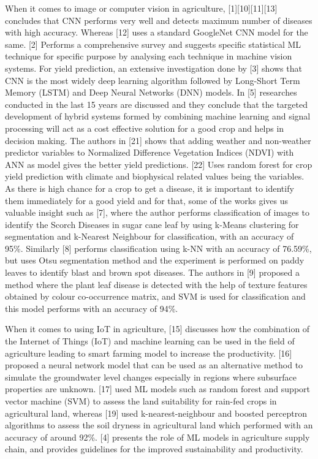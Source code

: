 \documentclass[12pt]{article}
\begin{document}
When it comes to image or computer vision in agriculture, [1][10][11][13] concludes that CNN performs very well  and detects maximum number of diseases with high accuracy. Whereas [12] uses a standard GoogleNet CNN model for the same. [2] Performs a comprehensive survey and suggests specific statistical ML technique for specific purpose by analysing each technique in machine vision systems. For yield prediction, an extensive investigation done by [3] shows that CNN is the most widely deep learning algorithm followed by Long-Short Term Memory (LSTM) and Deep Neural Networks (DNN) models. In [5] researches conducted in the last 15 years are discussed and they conclude that the targeted development of hybrid systems formed by combining machine learning and signal processing will act as a cost effective solution for a good crop and helps in decision making. The authors in [21] shows that adding weather and non-weather predictor variables to Normalized Difference Vegetation Indices (NDVI) with ANN as model gives the better yield predictions. [22] Uses random forest for crop yield prediction with climate and biophysical related values being the variables. As there is high chance for a crop to get a disease, it is important to identify them immediately for a good yield and for that, some of the works gives us valuable insight such as [7], where the author performs classification of images to identify the Scorch Diseases in sugar cane leaf by using k-Means clustering for segmentation and k-Nearest Neighbour for classification, with an accuracy of 95\%. Similarly [8] performs classification using k-NN with an accuracy of 76.59\%, but uses Otsu segmentation method and the experiment is performed on paddy leaves to identify blast and brown spot diseases. The authors in [9] proposed a method where the plant leaf disease is detected with the help of texture features obtained by colour co-occurrence matrix, and SVM is used for classification and this model performs with an accuracy of 94\%.

When it comes to using IoT in agriculture, [15] discusses how the combination of the Internet of Things (IoT) and machine learning can be used in the field of agriculture leading to smart farming model to increase the productivity. [16] proposed a neural network model that can be used as an alternative method to simulate the groundwater level changes especially in regions where subsurface properties are unknown. [17] used ML models such as random forest and support vector machine (SVM) to assess the land suitability for rain-fed crops in agricultural land, whereas [19] used k-nearest-neighbour and boosted perceptron algorithms to assess the soil dryness in agricultural land which performed with an accuracy of around 92\%.  [4] presents the role of ML models in agriculture supply chain, and provides guidelines for the improved sustainability and productivity.
\end{document}
